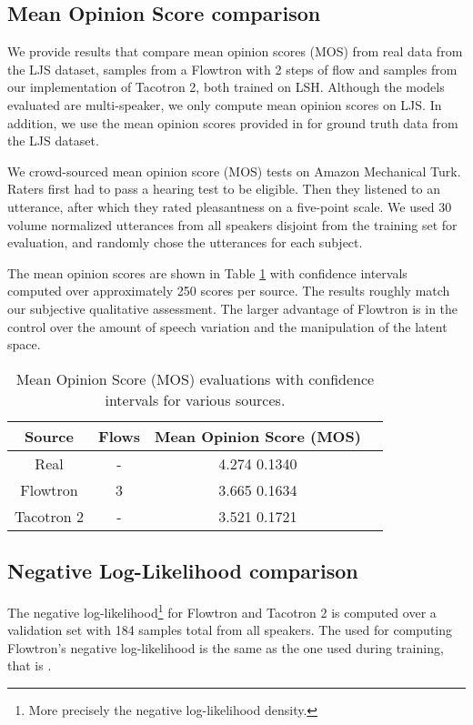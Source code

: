 \documentclass{article}
\begin{document}
\label{sec:quantitative_results}
\subsection{Mean Opinion Score comparison}
We provide results that compare mean opinion scores (MOS) from real data from the LJS dataset, samples from a Flowtron with 2 steps of flow and samples from our implementation of Tacotron 2, both trained on LSH. Although the models evaluated are multi-speaker, we only compute mean opinion scores on LJS. In addition, we use the mean opinion scores provided in \cite{prenger2019waveglow} for ground truth data from the LJS dataset.

We crowd-sourced mean opinion score (MOS) tests on Amazon Mechanical Turk. Raters first had to pass a hearing test to be eligible. Then they listened to an utterance, after which they rated pleasantness on a five-point scale. We used 30 volume normalized utterances from all speakers disjoint from the training set for evaluation, and randomly chose the utterances for each subject.

The mean opinion scores are shown in Table \ref{tab:mos_scores} with  confidence intervals computed over approximately 250 scores per source. The results roughly match our subjective qualitative assessment. The larger advantage of Flowtron is in the control over the amount of speech variation and the manipulation of the latent space. 

\begin{table}[!ht]
\begin{center}
    \begin{tabular}{c|c|c|c}
        \textbf{Source} & \textbf{Flows} &  \textbf{Mean Opinion Score (MOS)}\\
        \hline
        Real          & -         & 4.274  0.1340 \\
        Flowtron      & 3         & 3.665  0.1634 \\
        Tacotron 2    & -         & 3.521  0.1721 \\
    \end{tabular}
    \caption{Mean Opinion Score (MOS) evaluations with  confidence intervals for various sources.}
    \label{tab:mos_scores}
\end{center}
\end{table}

\subsection{Negative Log-Likelihood comparison}
The negative log-likelihood\footnote{More precisely the negative log-likelihood density.} for Flowtron and Tacotron 2 is computed over a validation set with 184 samples total from all speakers. The  used for computing Flowtron's negative log-likelihood is the same as the one used during training, that is . 
\end{document}
